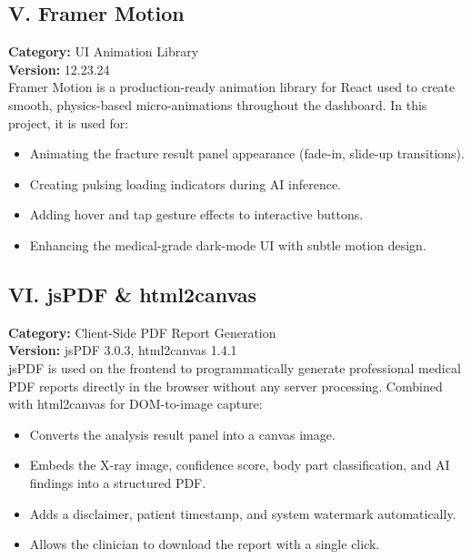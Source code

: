 \documentclass[a4paper,12pt]{report}
\begin{document}
    \subsection*{V. Framer Motion}
    \textbf{Category:} UI Animation Library\\
    \textbf{Version:} 12.23.24\\
    Framer Motion is a production-ready animation library for React used to create smooth, physics-based micro-animations throughout the dashboard. In this project, it is used for:
    \begin{itemize}
        \item Animating the fracture result panel appearance (fade-in, slide-up transitions).
        \item Creating pulsing loading indicators during AI inference.
        \item Adding hover and tap gesture effects to interactive buttons.
        \item Enhancing the medical-grade dark-mode UI with subtle motion design.
    \end{itemize}

    \subsection*{VI. jsPDF \& html2canvas}
    \textbf{Category:} Client-Side PDF Report Generation\\
    \textbf{Version:} jsPDF 3.0.3, html2canvas 1.4.1\\
    jsPDF is used on the frontend to programmatically generate professional medical PDF reports directly in the browser without any server processing. Combined with html2canvas for DOM-to-image capture:
    \begin{itemize}
        \item Converts the analysis result panel into a canvas image.
        \item Embeds the X-ray image, confidence score, body part classification, and AI findings into a structured PDF.
        \item Adds a disclaimer, patient timestamp, and system watermark automatically.
        \item Allows the clinician to download the report with a single click.
    \end{itemize}

\end{document}
